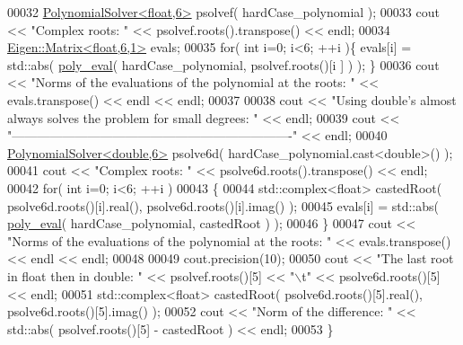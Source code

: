 \begin{DoxyCode}
00032   \hyperlink{class_eigen_1_1_polynomial_solver}{PolynomialSolver<float,6>} psolvef( hardCase\_polynomial );
00033   cout << \textcolor{stringliteral}{"Complex roots: "} << psolvef.roots().transpose() << endl;
00034   \hyperlink{group___core___module_class_eigen_1_1_matrix}{Eigen::Matrix<float,6,1>} evals;
00035   \textcolor{keywordflow}{for}( \textcolor{keywordtype}{int} i=0; i<6; ++i )\{ evals[i] = std::abs( \hyperlink{namespace_eigen_adb64ffddaa9e83634e3ab0e3fd3664f5}{poly\_eval}( hardCase\_polynomial, psolvef.roots()[i
      ] ) ); \}
00036   cout << \textcolor{stringliteral}{"Norms of the evaluations of the polynomial at the roots: "} << evals.transpose() << endl << endl;
00037 
00038   cout << \textcolor{stringliteral}{"Using double's almost always solves the problem for small degrees: "} << endl;
00039   cout << \textcolor{stringliteral}{"-------------------------------------------------------------------"} << endl;
00040   \hyperlink{class_eigen_1_1_polynomial_solver}{PolynomialSolver<double,6>} psolve6d( hardCase\_polynomial.cast<\textcolor{keywordtype}{double}>() );
00041   cout << \textcolor{stringliteral}{"Complex roots: "} << psolve6d.roots().transpose() << endl;
00042   \textcolor{keywordflow}{for}( \textcolor{keywordtype}{int} i=0; i<6; ++i )
00043   \{
00044     std::complex<float> castedRoot( psolve6d.roots()[i].real(), psolve6d.roots()[i].imag() );
00045     evals[i] = std::abs( \hyperlink{namespace_eigen_adb64ffddaa9e83634e3ab0e3fd3664f5}{poly\_eval}( hardCase\_polynomial, castedRoot ) );
00046   \}
00047   cout << \textcolor{stringliteral}{"Norms of the evaluations of the polynomial at the roots: "} << evals.transpose() << endl << endl;
00048 
00049   cout.precision(10);
00050   cout << \textcolor{stringliteral}{"The last root in float then in double: "} << psolvef.roots()[5] << \textcolor{stringliteral}{"\(\backslash\)t"} << psolve6d.roots()[5] <<
       endl;
00051   std::complex<float> castedRoot( psolve6d.roots()[5].real(), psolve6d.roots()[5].imag() );
00052   cout << \textcolor{stringliteral}{"Norm of the difference: "} << std::abs( psolvef.roots()[5] - castedRoot ) << endl;
00053 \}
\end{DoxyCode}
